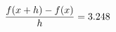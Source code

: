 \documentclass[preview]{standalone}
\begin{document}
\begin{align*}
\special{dvisvgm:raw <g id='unique000'>}\frac{f(x+h)-f(x)}{h} = 3.248\special{dvisvgm:raw </g>}
\end{align*}
\end{document}
